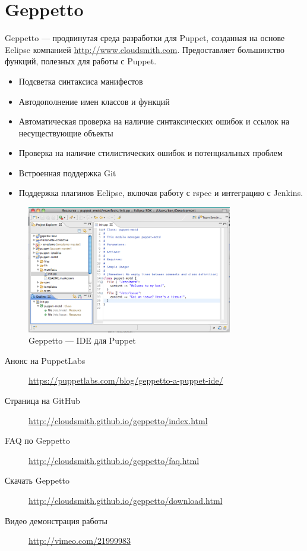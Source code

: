 \section{Geppetto}

Geppetto --- продвинутая среда разработки для Puppet, созданная на основе Eclipse компанией \url{http://www.cloudsmith.com}. Предоставляет большинство функций, полезных для работы с Puppet.

\begin{itemize}
\item Подсветка синтаксиса манифестов
\item Автодополнение имен классов и функций
\item Автоматическая проверка на наличие синтаксических ошибок и ссылок на несуществующие объекты
\item Проверка на наличие стилистических ошибок и потенциальных проблем
\item Встроенная поддержка Git
\item Поддержка плагинов Eclipse, включая работу с rspec и интеграцию с Jenkins.
\end{itemize}

\begin{figure}[h]
\centering
\includegraphics[width=0.8\textwidth]{img/geppetto.png}
\caption{Geppetto --- IDE для Puppet}
\label{fig:geppetto}
\end{figure}

\begin{description}
\item[Анонс на PuppetLabs] \url{https://puppetlabs.com/blog/geppetto-a-puppet-ide/}
\item[Страница на GitHub] \url{http://cloudsmith.github.io/geppetto/index.html}
\item[FAQ по Geppetto] \url{http://cloudsmith.github.io/geppetto/faq.html}
\item[Скачать Geppetto] \url{http://cloudsmith.github.io/geppetto/download.html}
\item[Видео демонстрация работы] \url{http://vimeo.com/21999983}
\end{description}
